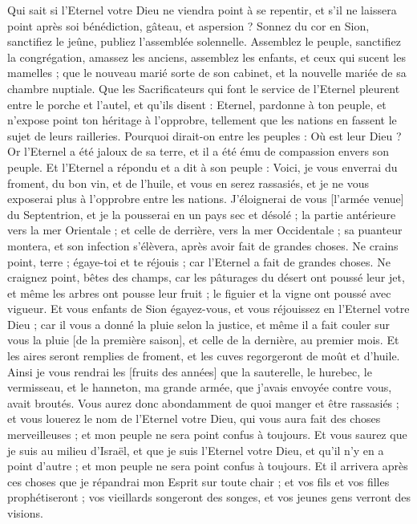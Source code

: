 \begin{multicols}{2}
Qui sait si l'Eternel votre Dieu ne viendra point à se repentir, et s'il ne laissera point après soi bénédiction, gâteau, et aspersion ?
Sonnez du cor en Sion, sanctifiez le jeûne, publiez l'assemblée solennelle.
Assemblez le peuple, sanctifiez la congrégation, amassez les anciens, assemblez les enfants, et ceux qui sucent les mamelles ; que le nouveau marié sorte de son cabinet, et la nouvelle mariée de sa chambre nuptiale.
Que les Sacrificateurs qui font le service de l'Eternel pleurent entre le porche et l'autel, et qu'ils disent : Eternel, pardonne à ton peuple, et n'expose point ton héritage à l'opprobre, tellement que les nations en fassent le sujet de leurs railleries. Pourquoi dirait-on entre les peuples : Où est leur Dieu ?
Or l'Eternel a été jaloux de sa terre, et il a été ému de compassion envers son peuple.
Et l'Eternel a répondu et a dit à son peuple : Voici, je vous enverrai du froment, du bon vin, et de l'huile, et vous en serez rassasiés, et je ne vous exposerai plus à l'opprobre entre les nations.
J'éloignerai de vous [l'armée venue] du Septentrion, et je la pousserai en un pays sec et désolé ; la partie antérieure vers la mer Orientale ; et celle de derrière, vers la mer Occidentale ; sa puanteur montera, et son infection s'élèvera, après avoir fait de grandes choses.
Ne crains point, terre ; égaye-toi et te réjouis ; car l'Eternel a fait de grandes choses.
Ne craignez point, bêtes des champs, car les pâturages du désert ont poussé leur jet, et même les arbres ont pousse leur fruit ; le figuier et la vigne ont poussé avec vigueur.
Et vous enfants de Sion égayez-vous, et vous réjouissez en l'Eternel votre Dieu ; car il vous a donné la pluie selon la justice, et même il a fait couler sur vous la pluie [de la première saison], et celle de la dernière, au premier mois.
Et les aires seront remplies de froment, et les cuves regorgeront de moût et d'huile.
Ainsi je vous rendrai les [fruits des années] que la sauterelle, le hurebec, le vermisseau, et le hanneton, ma grande armée, que j'avais envoyée contre vous, avait broutés.
Vous aurez donc abondamment de quoi manger et être rassasiés ; et vous louerez le nom de l'Eternel votre Dieu, qui vous aura fait des choses merveilleuses ; et mon peuple ne sera point confus à toujours.
Et vous saurez que je suis au milieu d'Israël, et que je suis l'Eternel votre Dieu, et qu'il n'y en a point d'autre ; et mon peuple ne sera point confus à toujours.
Et il arrivera après ces choses que je répandrai mon Esprit sur toute chair ; et vos fils et vos filles prophétiseront ; vos vieillards songeront des songes, et vos jeunes gens verront des visions.

\end{multicols}
